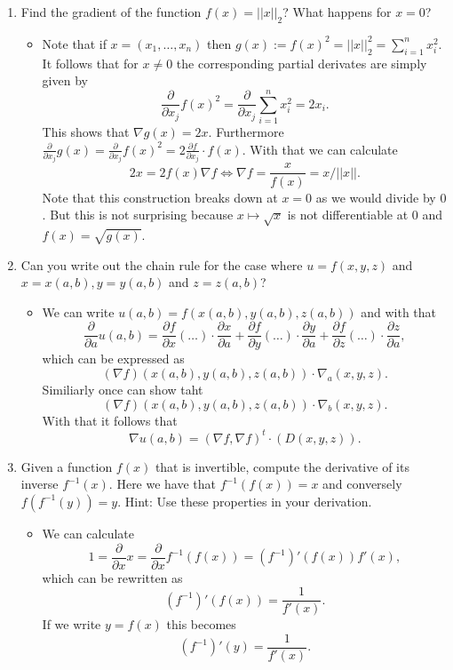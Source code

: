 \documentclass{article}
\begin{document}
\begin{enumerate}
\item Find the gradient of the function $f(x) = ||x||_2$? What happens for $x = 0$?
	\begin{itemize}
	\item Note that if $x = (x_1, \dots, x_n)$ then $g(x) := f(x)^2 = ||x||_2^2 = \sum_{i = 1}^n x_i^2$. It follows that for $x \neq 0$ the corresponding partial derivates are simply given by
	$$
	\frac{\partial}{\partial x_j} f(x)^2 = \frac{\partial}{\partial x_j} \sum_{i = 1}^n x_i^2 = 2 x_i.
	$$
	This shows that $\nabla g(x) = 2 x$. Furthermore $\frac{\partial}{\partial x_j} g(x) = \frac{\partial}{\partial x_j} f(x)^2 = 2 \frac{\partial f}{\partial x_j} \cdot f(x)$. With that we can calculate
	$$
	2x = 2 f(x) \nabla f \iff \nabla f = \frac{x}{f(x)} = x / ||x||.
	$$
	Note that this construction breaks down at $x = 0$ as we would divide by $0$. But this is not surprising because $x \mapsto \sqrt{x}$ is not differentiable at $0$ and $f(x) = \sqrt{g(x)}$.
	\end{itemize}

\item Can you write out the chain rule for the case where $u = f(x, y, z)$ and $x = x(a, b), y = y(a, b)$ and $z = z(a, b)$?
	\begin{itemize}
	\item We can write $u(a, b) = f(x(a, b), y(a, b), z(a, b))$ and with that
	$$
	\frac{\partial}{\partial a} u(a, b) = \frac{\partial f}{\partial x}(\dots) \cdot \frac{\partial x}{\partial a} + \frac{\partial f}{\partial y}(\dots) \cdot \frac{\partial y}{\partial a} + \frac{\partial f}{\partial z}(\dots) \cdot \frac{\partial z}{\partial a},
	$$
	which can be expressed as
	$$
	(\nabla f)(x(a, b), y(a, b), z(a, b)) \cdot \nabla_a (x, y, z).
	$$
	Similiarly once can show taht
	$$
	(\nabla f)(x(a, b), y(a, b), z(a, b)) \cdot \nabla_b (x, y, z).
	$$
	With that it follows that
	$$
	\nabla u(a, b) = (\nabla f, \nabla f)^t \cdot (D(x, y, z)).
	$$
	\end{itemize}

\item Given a function $f(x)$ that is invertible, compute the derivative of its inverse $f^{-1}(x)$. Here we have that $f^{-1}(f(x)) = x$ and conversely $f(f^{-1}(y)) = y$. Hint: Use these properties in your derivation.
	\begin{itemize}
		\item We can calculate
		$$
		1 = \frac{\partial}{\partial x} x = \frac{\partial}{\partial x} f^{-1}(f(x)) = (f^{-1})'(f(x)) f'(x),
		$$
		which can be rewritten as
		$$
		(f^{-1})'(f(x)) = \frac{1}{f'(x)}.
		$$
		If we write $y = f(x)$ this becomes
		$$
		(f^{-1})'(y) = \frac{1}{f'(x)}.
		$$
	\end{itemize}
\end{enumerate}
\end{document}
